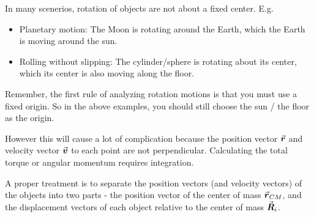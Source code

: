 \documentclass[class=article, crop=false, 12pt]{standalone}
\begin{document}
In many scenerios, 
rotation of objects are not about a fixed center. E.g. 
\begin{itemize}
    \item Planetary motion: The Moon is rotating around the Earth, 
    which the Earth is moving around the sun.
    \item Rolling without slipping: The cylinder/sphere is rotating about its center, 
    which its center is also moving along the floor.
\end{itemize}

Remember, the first rule of analyzing rotation motions is that you must use a fixed origin. 
So in the above examples, you should still choose the sun / the floor as the origin.


However this will cause a lot of complication because the position vector $\va*{r}$ and velocity vector $\va*{v}$ 
to each point are not perpendicular. Calculating the total torque or angular momentum requires integration.


A proper treatment is to separate the position vectors (and velocity vectors) of the objects into two parts - 
the position vector of the center of mass $\va*{r}_{CM}$, 
and the displacement vectors of each object relative to the center of mass $\va*{R}_{i}$.

\end{document}
